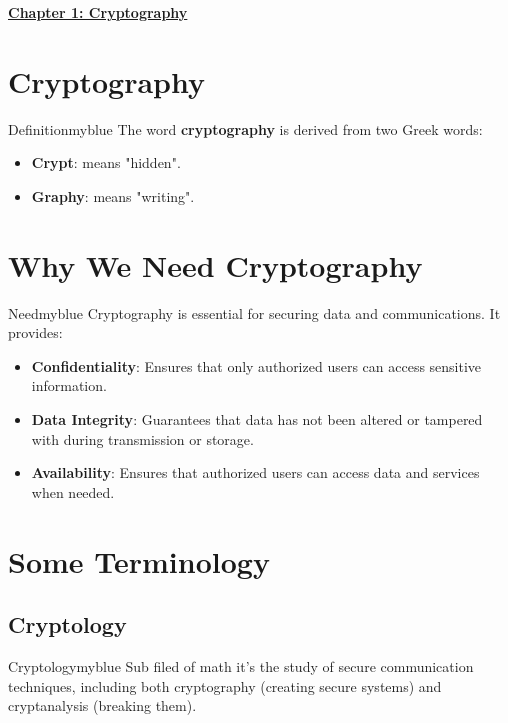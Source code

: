 \newpage
\begin{center}
    \Huge{\textbf{\underline{Chapter 1: Cryptography}}}
\end{center}

\setcounter{section}{0}

\section{Cryptography}
\begin{prettyBox}{Definition}{myblue}
The word \textbf{cryptography} is derived from two Greek words:
\begin{itemize}
    \item \textbf{Crypt}: means "hidden".
    \item \textbf{Graphy}: means "writing".
\end{itemize}
\end{prettyBox}

\vspace{0.5cm}

\section{Why We Need Cryptography}
\begin{prettyBox}{Need}{myblue}
Cryptography is essential for securing data and communications.
It provides:  
\begin{itemize}
    \item \textbf{Confidentiality}: Ensures that only authorized users can access sensitive information.
    \item \textbf{Data Integrity}: Guarantees that data has not been altered or tampered with during transmission or storage.
    \item \textbf{Availability}: Ensures that authorized users can access data and services when needed.
\end{itemize}
\end{prettyBox}

\vspace{0.5cm}


\section{Some Terminology}

\subsection{Cryptology}
\begin{prettyBox}{Cryptology}{myblue}
Sub filed of math it's the study of secure communication techniques, including both cryptography (creating secure systems) and cryptanalysis (breaking them).
\end{prettyBox}

